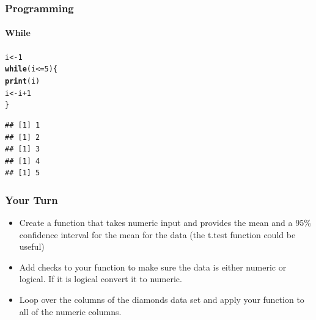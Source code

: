 \documentclass[10pt]{beamer}\usepackage[]{graphicx}\usepackage[]{color}
\makeatletter
\newcommand{\hlnum}[1]{\textcolor[rgb]{0.686,0.059,0.569}{#1}}%
\newcommand{\hlopt}[1]{\textcolor[rgb]{0,0,0}{#1}}%
\newcommand{\hlstd}[1]{\textcolor[rgb]{0.345,0.345,0.345}{#1}}%
\newcommand{\hlkwa}[1]{\textcolor[rgb]{0.161,0.373,0.58}{\textbf{#1}}}%
\newcommand{\hlkwb}[1]{\textcolor[rgb]{0.69,0.353,0.396}{#1}}%
\newcommand{\hlkwd}[1]{\textcolor[rgb]{0.737,0.353,0.396}{\textbf{#1}}}%
\newenvironment{kframe}{%
 \def\at@end@of@kframe{}%
 \ifinner\ifhmode%
  \def\at@end@of@kframe{\end{minipage}}%
  \begin{minipage}{\columnwidth}%
 \fi\fi%
 \def\FrameCommand##1{\hskip\@totalleftmargin \hskip-\fboxsep
 \colorbox{shadecolor}{##1}\hskip-\fboxsep
     \hskip-\linewidth \hskip-\@totalleftmargin \hskip\columnwidth}%
 \MakeFramed {\advance\hsize-\width
   \@totalleftmargin\z@ \linewidth\hsize
   \@setminipage}}%
 {\par\unskip\endMakeFramed%
 \at@end@of@kframe}
\newenvironment{knitrout}{}{} %
\makeatother
\begin{document}
\begin{frame}[fragile]
    \frametitle{Programming}
    \framesubtitle{While}

\begin{knitrout}\footnotesize
{}\color{fgcolor}\begin{kframe}
\begin{alltt}
\hlstd{i} \hlkwb{<-} \hlnum{1}
\hlkwa{while} \hlstd{(i} \hlopt{<=} \hlnum{5}\hlstd{) \{}
    \hlkwd{print}\hlstd{(i)}
    \hlstd{i} \hlkwb{<-} \hlstd{i} \hlopt{+} \hlnum{1}
\hlstd{\}}
\end{alltt}
\begin{verbatim}
## [1] 1
## [1] 2
## [1] 3
## [1] 4
## [1] 5
\end{verbatim}
\end{kframe}
\end{knitrout}

\end{frame}



\begin{frame}[fragile]
    \frametitle{Your Turn}
    \begin{itemize}
        \item Create a function that takes numeric input and provides the mean and a 95\% confidence interval for the mean for the data (the t.test function could be useful)
        \item Add checks to your function to make sure the data is either numeric or logical.  If it is logical convert it to numeric.
        \item Loop over the columns of the diamonds data set and apply your function to all of the numeric columns.
    \end{itemize}
\end{frame}
\end{document}
